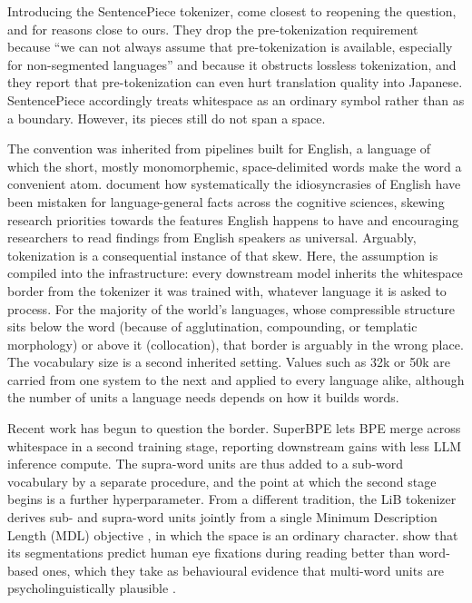 \documentclass[pdflatex,sn-apa]{sn-jnl}
\begin{document}
Introducing the SentencePiece tokenizer, \citet{kudo-richardson-2018-sentencepiece} come closest to reopening the question, and for reasons close to ours. They drop the pre-tokenization requirement because ``we can not always assume that pre-tokenization is
available, especially for non-segmented languages'' and because it obstructs
lossless tokenization, and they report that pre-tokenization can even hurt
translation quality into Japanese. SentencePiece accordingly treats whitespace
as an ordinary symbol rather than as a boundary. However, its pieces still do not
span a space. %

The convention was inherited from pipelines built for English, a language
of which the short, mostly monomorphemic, space-delimited words make the word a
convenient atom.
\citet{blasi2022overreliance} document how systematically the idiosyncrasies
of English have been mistaken for language-general facts across the cognitive
sciences, skewing research priorities towards the features English happens to
have and encouraging researchers to read findings from English speakers as
universal.
Arguably, tokenization is a consequential instance of that skew.
Here, the assumption is compiled into the infrastructure: every downstream model inherits the
whitespace border from the tokenizer it was trained with, whatever language it
is asked to process.
For the majority of the world's languages, whose compressible structure sits
below the word (because of agglutination, compounding, or templatic morphology) or above it
(collocation), that border is arguably in the wrong place.
The vocabulary size is a second inherited setting. Values such as 32k or 50k
are carried from one system to the next and applied to every language alike,
although the number of units a language needs depends on how it builds words.

Recent work has begun to question the border.
SuperBPE \citep{liu2025superbpe} lets BPE merge across whitespace in a second
training stage, reporting downstream gains with less LLM inference
compute. The supra-word units are thus added to a sub-word vocabulary by a
separate procedure, and the point at which the second stage begins is a
further hyperparameter.
From a different tradition, the LiB tokenizer
\citep{yang2020less,yang2024rethinking} derives sub- and supra-word units
jointly from a single Minimum Description Length (MDL) objective
\citep{rissanen1978modeling}, in which the space is an ordinary character.
\citet{yang2022eyefixations} show that its
segmentations predict human eye fixations during reading better than
word-based ones, which they take as behavioural evidence that multi-word units are
psycholinguistically plausible \citep{wray2002formulaic,arnon2021starting}.
\end{document}
